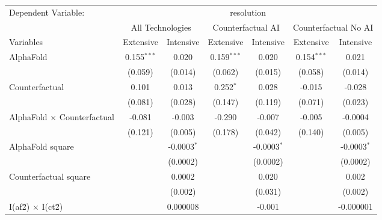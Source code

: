 \begingroup
\centering
\begin{tabular}{lcccccc}
   \tabularnewline \midrule \midrule
   Dependent Variable: & \multicolumn{6}{c}{resolution}\\
 & \multicolumn{2}{c}{All Technologies} & \multicolumn{2}{c}{Counterfactual AI} & \multicolumn{2}{c}{Counterfactual No AI} \\
\cmidrule(lr){1-1}\cmidrule(lr){2-3} \cmidrule(lr){4-5} \cmidrule(lr){6-7}
Variables & \multicolumn{1}{c}{Extensive} & \multicolumn{1}{c}{Intensive} & \multicolumn{1}{c}{Extensive} & \multicolumn{1}{c}{Intensive} & \multicolumn{1}{c}{Extensive} & \multicolumn{1}{c}{Intensive} \\
\cmidrule(lr){1-1}\cmidrule(lr){2-2} \cmidrule(lr){3-3} \cmidrule(lr){4-4} \cmidrule(lr){5-5} \cmidrule(lr){6-6} \cmidrule(lr){7-7}
   AlphaFold                          & 0.155$^{***}$ & 0.020         & 0.159$^{***}$ & 0.020         & 0.154$^{***}$ & 0.021\\   
                                      & (0.059)       & (0.014)       & (0.062)       & (0.015)       & (0.058)       & (0.014)\\   
   Counterfactual                     & 0.101         & 0.013         & 0.252$^{*}$   & 0.028         & -0.015        & -0.028\\   
                                      & (0.081)       & (0.028)       & (0.147)       & (0.119)       & (0.071)       & (0.023)\\   
   AlphaFold $\times$ Counterfactual  & -0.081        & -0.003        & -0.290        & -0.007        & -0.005        & -0.0004\\   
                                      & (0.121)       & (0.005)       & (0.178)       & (0.042)       & (0.140)       & (0.005)\\   
   AlphaFold square                   &               & -0.0003$^{*}$ &               & -0.0003$^{*}$ &               & -0.0003$^{*}$\\   
                                      &               & (0.0002)      &               & (0.0002)      &               & (0.0002)\\   
   Counterfactual square              &               & 0.0002        &               & 0.020         &               & 0.002\\   
                                      &               & (0.002)       &               & (0.031)       &               & (0.002)\\   
   I(af\^2) $\times$ I(ct\^2)         &               & 0.000008      &               & -0.001        &               & -0.000001\\   

\end{tabular}

